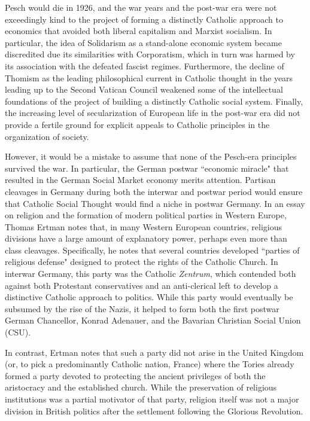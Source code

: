 \documentclass{article}
\begin{document}
Pesch would die in 1926, and the war years and the post-war era were not exceedingly kind to the project of forming a distinctly Catholic approach to economics that avoided both liberal capitalism and Marxist socialism.  In particular, the idea of Solidarism as a stand-alone economic system became discredited due its similarities with Corporatism, which in turn was harmed by its association with the defeated fascist regimes.  Furthermore, the decline of Thomism as the leading philosophical current in Catholic thought in the years leading up to the Second Vatican Council weakened some of the intellectual foundations of the project of building a distinctly Catholic social system.  Finally, the increasing level of secularization of European life in the post-war era did not provide a fertile ground for explicit appeals to Catholic principles in the organization of society.\citep{almodovarteixeira2008}\medskip

However, it would be a mistake to assume that none of the Pesch-era principles survived the war.  In particular, the German postwar ``economic miracle" that resulted in the German Social Market economy merits attention.  Partisan cleavages in Germany during both the interwar and postwar period would ensure that Catholic Social Thought would find a niche in postwar Germany.  In an essay on religion and the formation of modern political parties in Western Europe, Thomas Ertman notes that, in many Western European countries, religious divisions have a large amount of explanatory power, perhaps even more than class cleavages.\citep{ertman2009western}  Specifically, he notes that several countries developed ``parties of religious defense" designed to protect the rights of the Catholic Church.  In interwar Germany, this party was the Catholic \emph{Zentrum}, which contended both against both Protestant conservatives and an anti-clerical left to develop a distinctive Catholic approach to politics.  While this party would eventually be subsumed by the rise of the Nazis, it helped to form both the first postwar German Chancellor, Konrad Adenauer, and the Bavarian Christian Social Union (CSU).\medskip

In contrast, Ertman notes that such a party did not arise in the United Kingdom (or, to pick a predominantly Catholic nation, France) where the Tories already formed a party devoted to protecting the ancient privileges of both the aristocracy and the established church.  While the preservation of religious institutions was a partial motivator of that party, religion itself was not a major division in British politics after the settlement following the Glorious Revolution.\medskip
\end{document}
